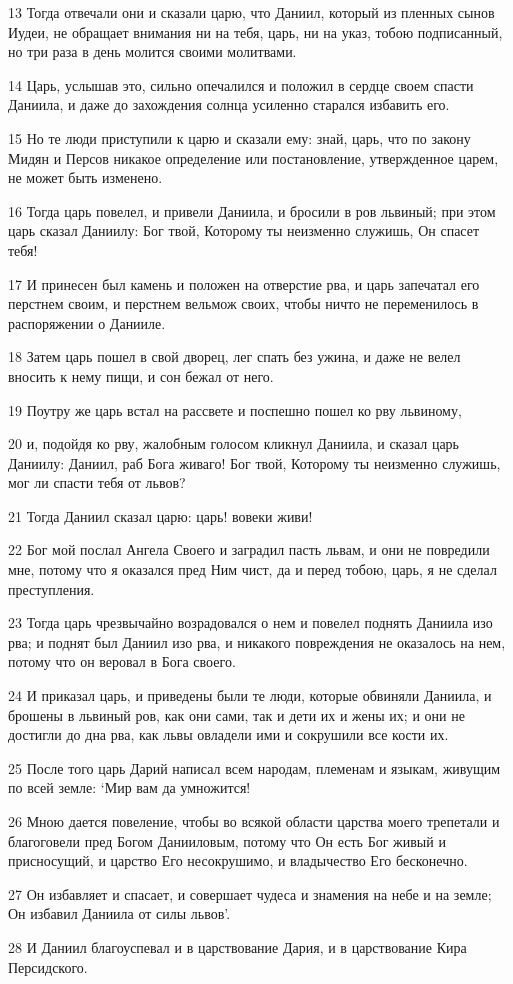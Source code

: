 \par 13 Тогда отвечали они и сказали царю, что Даниил, который из пленных сынов Иудеи, не обращает внимания ни на тебя, царь, ни на указ, тобою подписанный, но три раза в день молится своими молитвами.
\par 14 Царь, услышав это, сильно опечалился и положил в сердце своем спасти Даниила, и даже до захождения солнца усиленно старался избавить его.
\par 15 Но те люди приступили к царю и сказали ему: знай, царь, что по закону Мидян и Персов никакое определение или постановление, утвержденное царем, не может быть изменено.
\par 16 Тогда царь повелел, и привели Даниила, и бросили в ров львиный; при этом царь сказал Даниилу: Бог твой, Которому ты неизменно служишь, Он спасет тебя!
\par 17 И принесен был камень и положен на отверстие рва, и царь запечатал его перстнем своим, и перстнем вельмож своих, чтобы ничто не переменилось в распоряжении о Данииле.
\par 18 Затем царь пошел в свой дворец, лег спать без ужина, и даже не велел вносить к нему пищи, и сон бежал от него.
\par 19 Поутру же царь встал на рассвете и поспешно пошел ко рву львиному,
\par 20 и, подойдя ко рву, жалобным голосом кликнул Даниила, и сказал царь Даниилу: Даниил, раб Бога живаго! Бог твой, Которому ты неизменно служишь, мог ли спасти тебя от львов?
\par 21 Тогда Даниил сказал царю: царь! вовеки живи!
\par 22 Бог мой послал Ангела Своего и заградил пасть львам, и они не повредили мне, потому что я оказался пред Ним чист, да и перед тобою, царь, я не сделал преступления.
\par 23 Тогда царь чрезвычайно возрадовался о нем и повелел поднять Даниила изо рва; и поднят был Даниил изо рва, и никакого повреждения не оказалось на нем, потому что он веровал в Бога своего.
\par 24 И приказал царь, и приведены были те люди, которые обвиняли Даниила, и брошены в львиный ров, как они сами, так и дети их и жены их; и они не достигли до дна рва, как львы овладели ими и сокрушили все кости их.
\par 25 После того царь Дарий написал всем народам, племенам и языкам, живущим по всей земле: `Мир вам да умножится!
\par 26 Мною дается повеление, чтобы во всякой области царства моего трепетали и благоговели пред Богом Данииловым, потому что Он есть Бог живый и присносущий, и царство Его несокрушимо, и владычество Его бесконечно.
\par 27 Он избавляет и спасает, и совершает чудеса и знамения на небе и на земле; Он избавил Даниила от силы львов'.
\par 28 И Даниил благоуспевал и в царствование Дария, и в царствование Кира Персидского.


